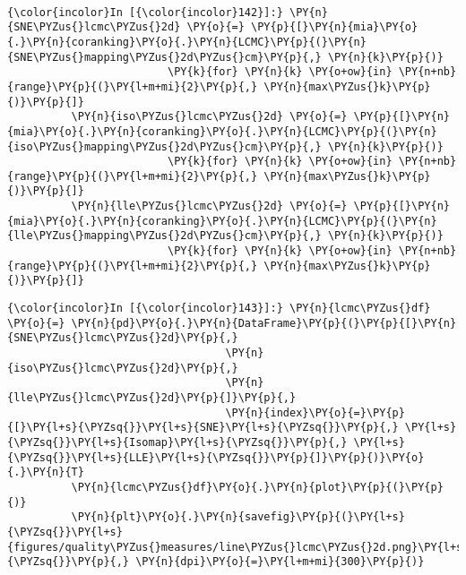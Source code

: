     \begin{center}
    \end{center}
    { \hspace*{\fill} \\}

    \begin{Verbatim}[commandchars=\\\{\}]
{\color{incolor}In [{\color{incolor}142}]:} \PY{n}{SNE\PYZus{}lcmc\PYZus{}2d} \PY{o}{=} \PY{p}{[}\PY{n}{mia}\PY{o}{.}\PY{n}{coranking}\PY{o}{.}\PY{n}{LCMC}\PY{p}{(}\PY{n}{SNE\PYZus{}mapping\PYZus{}2d\PYZus{}cm}\PY{p}{,} \PY{n}{k}\PY{p}{)}
                         \PY{k}{for} \PY{n}{k} \PY{o+ow}{in} \PY{n+nb}{range}\PY{p}{(}\PY{l+m+mi}{2}\PY{p}{,} \PY{n}{max\PYZus{}k}\PY{p}{)}\PY{p}{]}
          \PY{n}{iso\PYZus{}lcmc\PYZus{}2d} \PY{o}{=} \PY{p}{[}\PY{n}{mia}\PY{o}{.}\PY{n}{coranking}\PY{o}{.}\PY{n}{LCMC}\PY{p}{(}\PY{n}{iso\PYZus{}mapping\PYZus{}2d\PYZus{}cm}\PY{p}{,} \PY{n}{k}\PY{p}{)}
                         \PY{k}{for} \PY{n}{k} \PY{o+ow}{in} \PY{n+nb}{range}\PY{p}{(}\PY{l+m+mi}{2}\PY{p}{,} \PY{n}{max\PYZus{}k}\PY{p}{)}\PY{p}{]}
          \PY{n}{lle\PYZus{}lcmc\PYZus{}2d} \PY{o}{=} \PY{p}{[}\PY{n}{mia}\PY{o}{.}\PY{n}{coranking}\PY{o}{.}\PY{n}{LCMC}\PY{p}{(}\PY{n}{lle\PYZus{}mapping\PYZus{}2d\PYZus{}cm}\PY{p}{,} \PY{n}{k}\PY{p}{)}
                         \PY{k}{for} \PY{n}{k} \PY{o+ow}{in} \PY{n+nb}{range}\PY{p}{(}\PY{l+m+mi}{2}\PY{p}{,} \PY{n}{max\PYZus{}k}\PY{p}{)}\PY{p}{]}
\end{Verbatim}

    \begin{Verbatim}[commandchars=\\\{\}]
{\color{incolor}In [{\color{incolor}143}]:} \PY{n}{lcmc\PYZus{}df} \PY{o}{=} \PY{n}{pd}\PY{o}{.}\PY{n}{DataFrame}\PY{p}{(}\PY{p}{[}\PY{n}{SNE\PYZus{}lcmc\PYZus{}2d}\PY{p}{,}
                                  \PY{n}{iso\PYZus{}lcmc\PYZus{}2d}\PY{p}{,}
                                  \PY{n}{lle\PYZus{}lcmc\PYZus{}2d}\PY{p}{]}\PY{p}{,}
                                  \PY{n}{index}\PY{o}{=}\PY{p}{[}\PY{l+s}{\PYZsq{}}\PY{l+s}{SNE}\PY{l+s}{\PYZsq{}}\PY{p}{,} \PY{l+s}{\PYZsq{}}\PY{l+s}{Isomap}\PY{l+s}{\PYZsq{}}\PY{p}{,} \PY{l+s}{\PYZsq{}}\PY{l+s}{LLE}\PY{l+s}{\PYZsq{}}\PY{p}{]}\PY{p}{)}\PY{o}{.}\PY{n}{T}
          \PY{n}{lcmc\PYZus{}df}\PY{o}{.}\PY{n}{plot}\PY{p}{(}\PY{p}{)}
          \PY{n}{plt}\PY{o}{.}\PY{n}{savefig}\PY{p}{(}\PY{l+s}{\PYZsq{}}\PY{l+s}{figures/quality\PYZus{}measures/line\PYZus{}lcmc\PYZus{}2d.png}\PY{l+s}{\PYZsq{}}\PY{p}{,} \PY{n}{dpi}\PY{o}{=}\PY{l+m+mi}{300}\PY{p}{)}
\end{Verbatim}

